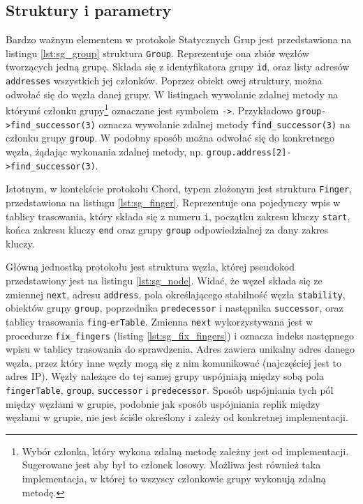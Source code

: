 \documentclass[12pt, twoside, openany]{report}
\begin{document}
\subsection{Struktury i parametry}

Bardzo ważnym elementem w protokole Statycznych Grup jest przedstawiona na listingu \ref{lst:sg_group} struktura \texttt{Group}. Reprezentuje ona zbiór węzłów tworzących jedną grupę. Składa się z identyfikatora grupy \texttt{id}, oraz listy adresów \texttt{addresses} wszystkich jej członków. Poprzez obiekt owej struktury, można odwołać się do węzła danej grupy. W listingach wywołanie zdalnej metody na którymś członku grupy\footnote{Wybór członka, który wykona zdalną metodę zależny jest od implementacji. Sugerowane jest aby był to członek losowy. Możliwa jest również taka implementacja, w której to wszyscy członkowie grupy wykonują zdalną metodę.} oznaczane jest symbolem \texttt{->}. Przykładowo \texttt{group->find\_successor(3)} oznacza wywołanie zdalnej metody \texttt{find\_successor(3)} na członku grupy \texttt{group}. W podobny sposób można odwołać się do konkretnego węzła, żądając wykonania zdalnej metody, np. \texttt{group.address[2]->find\_successor(3)}.

Istotnym, w kontekście protokołu Chord, typem złożonym jest struktura \texttt{Finger}, przedstawiona na listingu \ref{lst:sg_finger}. Reprezentuje ona pojedynczy wpis w tablicy trasowania, który składa się z numeru \texttt{i}, początku zakresu kluczy \texttt{start}, końca zakresu kluczy \texttt{end} oraz grupy \texttt{group} odpowiedzialnej za dany zakres kluczy.







Główną jednostką protokołu jest struktura węzła, której pseudokod przedstawiony jest na listingu \ref{lst:sg_node}. Widać, że węzeł składa się ze zmiennej \texttt{next}, adresu \texttt{address}, pola określającego stabilność węzła \texttt{stability}, obiektów grupy \texttt{group}, poprzednika \texttt{predecessor} i następnika \texttt{successor}, oraz tablicy trasowania \texttt{fing}-\texttt{erTable}. Zmienna \texttt{next} wykorzystywana jest w procedurze \texttt{fix\_fingers} (listing \ref{lst:sg_fix_fingers}) i oznacza indeks następnego wpisu w tablicy trasowania do sprawdzenia. Adres zawiera unikalny adres danego węzła, przez który inne węzły mogą się z nim komunikować (najczęściej jest to adres IP). Węzły należące do tej samej grupy uspójniają między sobą pola \texttt{fingerTable}, \texttt{group}, \texttt{successor} i \texttt{predecessor}. Sposób uspójniania tych pól między węzłami w grupie, podobnie jak sposób uspójniania replik między węzłami w grupie, nie jest ściśle określony i zależy od konkretnej implementacji.
\end{document}
